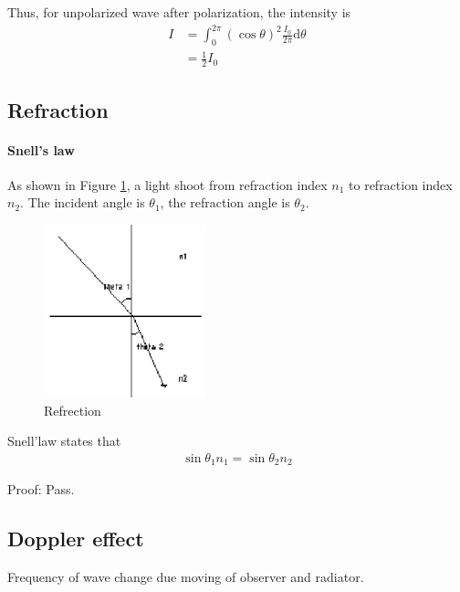             Thus, for unpolarized wave after polarization, the intensity is 
            \begin{align}
                I &= \int_{0}^{2 \pi} (\cos \theta)^2 \frac{I_0}{2 \pi} \mathrm{d} \theta \\
                  &= \frac{1}{2} I_0
            \end{align} 

    \subsection{Refraction}
        \paragraph{Snell's law}
            As shown in Figure \ref{refre_dia}, a light shoot from refraction index $n_1$ to refraction index $n_2$. The incident angle is $\theta_1$, the refraction angle is $\theta_2$.

            \begin{figure}[H]
                \begin{center}
                    \includegraphics[height=5cm]{wave_charts/refre_dia.eps}
                \end{center}
                \caption{Refrection}
                \label{refre_dia}
            \end{figure}

            Snell'law states that
            \begin{align}
                \sin \theta_1 n_1 = \sin \theta_2 n_2
            \end{align}

            Proof: Pass.

        
    \subsection{Doppler effect}
        Frequency of wave change due moving of observer and radiator.


